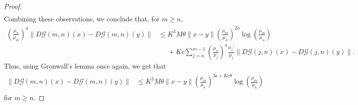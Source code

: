\documentclass[reqno, a4paper, 10pt]{amsart}
\theoremstyle{plain}
\numberwithin{equation}{section}
\theoremstyle{remark}
\begin{document}
\begin{proof}
\[\begin{split}
\end{split}
\]
Combining these observations, we conclude that, for $m\geq n$,
\[
\begin{split}
\left (\frac{\mu_n}{\mu_m}\right )^a\|D\mathcal G(m, n)(x)-D\mathcal G(m, n)(y)\| &\le K^3M \theta \|x-y\|\left (\frac{\mu_m}{\mu_n}\right )^{2\tilde a} \log \left (\frac{\mu_m}{\mu_n}\right ) \\
&\phantom{\le}+Kc \sum_{j=n}^{m-1}\left (\frac{\mu_n}{\mu_{j}}\right )^a  \frac{\mu_j'}{\mu_j}\|D\mathcal G(j, n)(x)-D\mathcal G(j, n)(y)\|.
\end{split}
\]
Thus, using Gronwall's lemma once again, we get that
\begin{equation}\label{eq: DG is holder}
\begin{split}
\|D\mathcal G(m, n)(x)-D\mathcal G(m, n)(y)\| &\le K^3M \theta \|x-y\|\left (\frac{\mu_m}{\mu_n}\right )^{3\tilde a+Kc\theta} \log \left (\frac{\mu_m}{\mu_n}\right )\\
\end{split}
\end{equation}
for $m\geq n$.




\end{proof}
\end{document}
